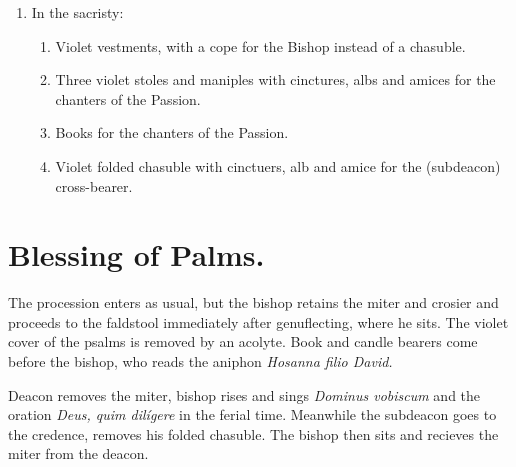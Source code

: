 {\begin{enumerate}[label=\Roman*.]
        \begin{enumerate}[label=\arabic*.]

            \item Broad stole for the deacon.

            \item Violet ribbon to fasten the palm on the processional cross.

        \end{enumerate}

    \item In the sacristy:

        \begin{enumerate}[label=\arabic*.]

            \item Violet vestments, with a cope for the Bishop instead of a
                chasuble.

            \item Three violet stoles and maniples with cinctures, albs and
                amices for the chanters of the Passion.

            \item Books for the chanters of the Passion.

            \item Violet folded chasuble with cinctuers, alb and amice for the
                (subdeacon) cross-bearer.

        \end{enumerate}

\end{enumerate}

\section{Blessing of Palms.}

\rubric The procession enters as usual, but the bishop retains the miter and
crosier and proceeds to the faldstool immediately after genuflecting, where he
sits. The violet cover of the psalms is removed by an acolyte. Book and candle
bearers come before the bishop, who reads the aniphon \textit{Hosanna filio
David.}

\rubric Deacon removes the miter, bishop rises and sings \textit{Dominus
vobiscum} and the oration \textit{Deus, quim dilígere} in the ferial time.
Meanwhile the subdeacon goes to the credence, removes his folded chasuble. The
bishop then sits and recieves the miter from the deacon. 

}
